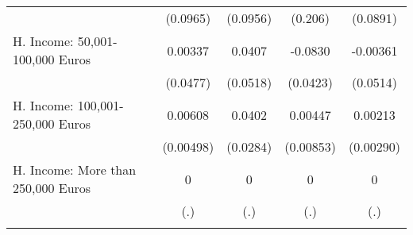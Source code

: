 {\begin{tabular}{l*{4}{c}}
            &    (0.0965)         &    (0.0956)         &     (0.206)         &    (0.0891)         \\
[1em]
H. Income: 50,001-100,000 Euros&     0.00337         &      0.0407         &     -0.0830\sym{*}  &    -0.00361         \\
            &    (0.0477)         &    (0.0518)         &    (0.0423)         &    (0.0514)         \\
[1em]
H. Income: 100,001-250,000 Euros&     0.00608         &      0.0402         &     0.00447         &     0.00213         \\
            &   (0.00498)         &    (0.0284)         &   (0.00853)         &   (0.00290)         \\
[1em]
H. Income: More than 250,000 Euros&           0         &           0         &           0         &           0         \\
            &         (.)         &         (.)         &         (.)         &         (.)         \\
\hline\hline
{}\\
\end{tabular}
}
